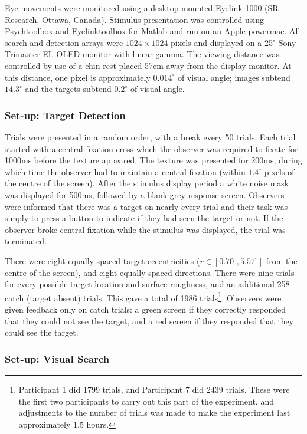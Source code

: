 \documentclass[man]{apa6}
\begin{document}
Eye movements were monitored using a desktop-mounted Eyelink 1000 (SR Research, Ottawa, Canada). Stimulus presentation was controlled using Psychtoolbox \parencite{brainard1997} and Eyelinktoolbox \parencite{cornelissen2002} for Matlab and run on an Apple powermac. All search and detection arrays were $1024\times 1024$ pixels and displayed on a 25" Sony Trimaster EL OLED monitor with linear gamma. The viewing distance was controlled by use of a chin rest placed 57cm away from the display monitor. At this distance, one pixel is approximately $0.014^{\circ}$ of visual angle; images subtend $14.3^{\circ}$ and the targets subtend $0.2^{\circ}$ of visual angle. 

\subsubsection{Set-up: Target Detection}
Trials were presented in a random order, with a break every 50 trials. Each trial started with a central fixation cross which the observer was required to fixate for 1000ms before the texture appeared. The texture was presented for 200ms, during which time the observer had to maintain a central fixation (within $1.4^{\circ}$ pixels of the centre of the screen). After the stimulus display period a white noise mask was displayed for 500ms, followed by a blank grey response screen. Observers were informed that there was a target on nearly every trial and their task was simply to press a button to indicate if they had seen the target or not. If the observer broke central fixation while the stimulus was displayed, the trial was terminated. 

There were eight equally spaced target eccentricities ($r \in [0.70^{\circ}, 5.57^{\circ}]$ from the centre of the screen), and eight equally spaced directions. There were nine trials for every possible target location and surface roughness, and an additional 258 catch (target absent) trials. This gave a total of 1986 trials\footnote{Participant 1 did 1799 trials, and Participant 7 did 2439 trials. These were the first two participants to carry out this part of the experiment, and adjustments to the number of trials was made to make the experiment last approximately  $1.5$ hours.}. Observers were given feedback only on catch trials: a green screen if they correctly responded that they could not see the target, and a red screen if they responded that they could see the target.
\par

\subsubsection{Set-up: Visual Search} 
\end{document}
